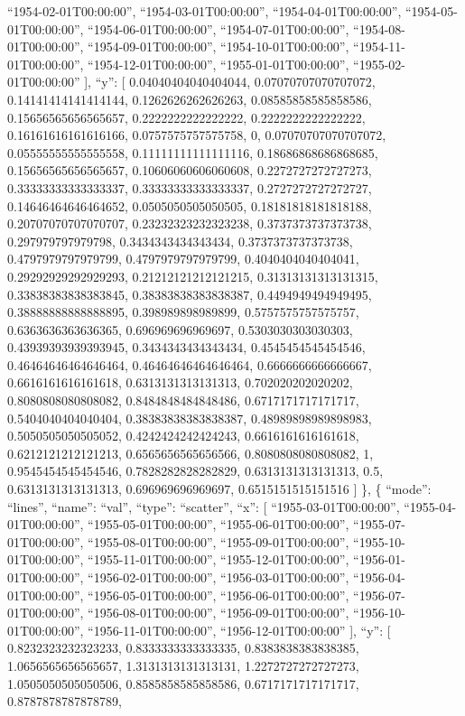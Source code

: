 \documentclass[
]{article}
\begin{document}
``1954-02-01T00:00:00'', ``1954-03-01T00:00:00'',
``1954-04-01T00:00:00'', ``1954-05-01T00:00:00'',
``1954-06-01T00:00:00'', ``1954-07-01T00:00:00'',
``1954-08-01T00:00:00'', ``1954-09-01T00:00:00'',
``1954-10-01T00:00:00'', ``1954-11-01T00:00:00'',
``1954-12-01T00:00:00'', ``1955-01-01T00:00:00'',
``1955-02-01T00:00:00'' {]}, ``y'': {[} 0.04040404040404044,
0.07070707070707072, 0.14141414141414144, 0.1262626262626263,
0.08585858585858586, 0.15656565656565657, 0.2222222222222222,
0.2222222222222222, 0.16161616161616166, 0.0757575757575758, 0,
0.07070707070707072, 0.05555555555555558, 0.11111111111111116,
0.18686868686868685, 0.15656565656565657, 0.10606060606060608,
0.2272727272727273, 0.33333333333333337, 0.33333333333333337,
0.2727272727272727, 0.14646464646464652, 0.0505050505050505,
0.18181818181818188, 0.20707070707070707, 0.23232323232323238,
0.3737373737373738, 0.297979797979798, 0.3434343434343434,
0.3737373737373738, 0.4797979797979799, 0.4797979797979799,
0.4040404040404041, 0.29292929292929293, 0.21212121212121215,
0.31313131313131315, 0.33838383838383845, 0.38383838383838387,
0.4494949494949495, 0.38888888888888895, 0.398989898989899,
0.5757575757575757, 0.6363636363636365, 0.696969696969697,
0.5303030303030303, 0.43939393939393945, 0.3434343434343434,
0.4545454545454546, 0.46464646464646464, 0.46464646464646464,
0.6666666666666667, 0.6616161616161618, 0.6313131313131313,
0.702020202020202, 0.8080808080808082, 0.8484848484848486,
0.6717171717171717, 0.5404040404040404, 0.38383838383838387,
0.48989898989898983, 0.5050505050505052, 0.4242424242424243,
0.6616161616161618, 0.6212121212121213, 0.6565656565656566,
0.8080808080808082, 1, 0.9545454545454546, 0.7828282828282829,
0.6313131313131313, 0.5, 0.6313131313131313, 0.696969696969697,
0.6515151515151516 {]} \}, \{ ``mode'': ``lines'', ``name'': ``val'',
``type'': ``scatter'', ``x'': {[} ``1955-03-01T00:00:00'',
``1955-04-01T00:00:00'', ``1955-05-01T00:00:00'',
``1955-06-01T00:00:00'', ``1955-07-01T00:00:00'',
``1955-08-01T00:00:00'', ``1955-09-01T00:00:00'',
``1955-10-01T00:00:00'', ``1955-11-01T00:00:00'',
``1955-12-01T00:00:00'', ``1956-01-01T00:00:00'',
``1956-02-01T00:00:00'', ``1956-03-01T00:00:00'',
``1956-04-01T00:00:00'', ``1956-05-01T00:00:00'',
``1956-06-01T00:00:00'', ``1956-07-01T00:00:00'',
``1956-08-01T00:00:00'', ``1956-09-01T00:00:00'',
``1956-10-01T00:00:00'', ``1956-11-01T00:00:00'',
``1956-12-01T00:00:00'' {]}, ``y'': {[} 0.8232323232323233,
0.8333333333333335, 0.8383838383838385, 1.0656565656565657,
1.3131313131313131, 1.2272727272727273, 1.0505050505050506,
0.8585858585858586, 0.6717171717171717, 0.8787878787878789,
\end{document}
